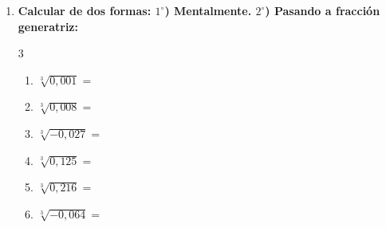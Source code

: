 \documentclass[a4paper,12pt]{article}
\begin{document}
\begin{enumerate}[start=4]
    \item \textbf{Calcular de dos formas: $1^\circ$) Mentalmente. $2^\circ$) Pasando a fracción generatriz:}
    \begin{multicols}{3}
    \begin{enumerate}[label=\alph*)]
        \item $\sqrt[3]{0,001} =$
        \item $\sqrt[3]{0,008} =$
        \item $\sqrt[3]{-0,027} =$
        \item $\sqrt[3]{0,125} =$
        \item $\sqrt[3]{0,216} =$
        \item $\sqrt[3]{-0,064} =$
    \end{enumerate}
    \end{multicols}


\end{enumerate}
\end{document}
